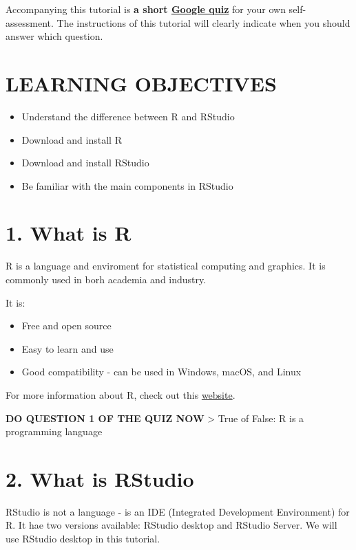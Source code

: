 \documentclass[
]{book}
\begin{document}
Accompanying this tutorial is \textbf{a short \href{https://forms.gle/Xf1AfoGaxhwrWRQ38}{Google quiz}} for your own self-assessment. The instructions of this tutorial will clearly indicate when you should answer which question.

\hypertarget{learning-objectives}{%
\section{LEARNING OBJECTIVES}\label{learning-objectives}}

\begin{itemize}
\item
  Understand the difference between R and RStudio
\item
  Download and install R
\item
  Download and install RStudio
\item
  Be familiar with the main components in RStudio
\end{itemize}

\hypertarget{what-is-r}{%
\section{1. What is R}\label{what-is-r}}

R is a language and enviroment for statistical computing and graphics. It is commonly used in borh academia and industry.

It is:

\begin{itemize}
\item
  Free and open source
\item
  Easy to learn and use
\item
  Good compatibility - can be used in Windows, macOS, and Linux
\end{itemize}

For more information about R, check out this \href{https://www.r-project.org/about.html}{website}.

\textbf{DO QUESTION 1 OF THE QUIZ NOW}
\textgreater{} True of False: R is a programming language

\hypertarget{what-is-rstudio}{%
\section{2. What is RStudio}\label{what-is-rstudio}}

RStudio is not a language - is an IDE (Integrated Development Environment) for R. It hae two versions available: RStudio desktop and RStudio Server. We will use RStudio desktop in this tutorial.
\end{document}
